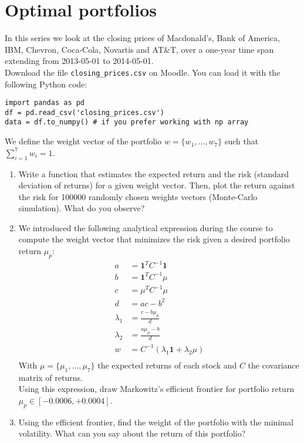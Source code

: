 \section*{Optimal portfolios}
In this series we look at the closing prices of Macdonald's, Bank of America, IBM, Chevron, Coca-Cola, Novartis and AT\&T, over a one-year time span extending from 2013-05-01 to 2014-05-01. \\

\noindent Download the file \texttt{closing\_prices.csv} on Moodle. You can load it with the following Python code:

\begin{verbatim}
import pandas as pd
df = pd.read_csv('closing_prices.csv')
data = df.to_numpy() # if you prefer working with np array
\end{verbatim}

\noindent We define the weight vector of the portfolio $w = \{w_1, ..., w_7\}$ such that $\sum\limits_{i=1}^{7} w_i = 1$.

\begin{enumerate}
    \item Write a function that estimates the expected return and the risk (standard deviation of returns) for a given weight vector. Then, plot the return against the risk for 100000 randomly chosen weights vectors (Monte-Carlo simulation). What do you observe?
    \item We introduced the following analytical expression during the course to compute the weight vector that minimizes the risk given a desired portfolio return $\mu_p$:
        \begin{equation}
        \begin{aligned}
            a &= \mathbf{1}^T C^{-1} \mathbf{1} \\
            b &= \mathbf{1}^T C^{-1} \mu  \\
            c &= \mu^T C^{-1} \mu  \\
            d &= ac - b^2 \\
            \lambda_1 &= \frac{c - b \mu_p}{d} \\
            \lambda_2 &= \frac{a \mu_p - b}{d} \\
            w &= C^{-1} (\lambda_1 \mathbf{1} + \lambda_2 \mu)  \\
        \end{aligned}
        \end{equation}
    With $\mu = \{\mu_1, ..., \mu_7\}$ the expected returns of each stock and $C$ the covariance matrix of returns.\\ 
        \noindent Using this expression, draw Markowitz's efficient frontier for portfolio return $\mu_p \in [-0.0006, +0.0004]$.
    \item Using the efficient frontier, find the weight of the portfolio with the minimal volatility. What can you say about the return of this portfolio?
\end{enumerate}